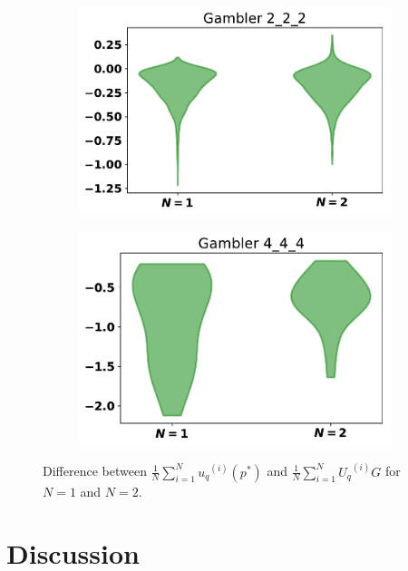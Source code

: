 \documentclass[10pt]{article}
\begin{document}
\begin{figure}
\begin{subfigure}{0.30\textwidth}
    \end{subfigure}
    \begin{subfigure}{0.30\textwidth}
        \centering
        \includegraphics[width=\textwidth]{"img/Gambler 2_2_2_boxplot"}
    \end{subfigure}
    \begin{subfigure}{0.30\textwidth}
        \centering
        \includegraphics[width=\textwidth]{"img/Gambler 4_4_4_boxplot"}
    \end{subfigure}
    \caption{Difference between \(\frac{1}{N} \sum\limits_{i=1} ^ {N} {u_q}^{(i)} (p ^ *)\)
    and  \(\frac{1}{N} \sum\limits_{i=1} ^ {N} {U_q}^{(i)} G\) for \(N=1\) and \(N=2\).}
    \label{fig:boxplots}
\end{figure}

\section{Discussion}
\end{document}

